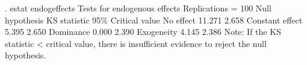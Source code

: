 . estat endogeffects
{\smallskip}
Tests for endogenous effects           Replications = 100
Null hypothesis  {\VBAR}     KS statistic    95\% Critical value
No effect        {\VBAR}           11.271                 2.658
Constant effect  {\VBAR}            5.395                 2.650
Dominance        {\VBAR}            0.000                 2.390
Exogeneity       {\VBAR}            4.145                 2.386
Note: If the KS statistic < critical value, there is
      insufficient evidence to reject the null
      hypothesis.
